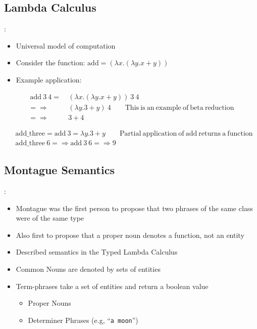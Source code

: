 \documentclass[logoontitle,tabu,supertabular,aspectratio=43]{preney-uwindsor-beamer}
\begin{document}
    \subsection{Lambda Calculus}
    \begin{frame}{\insertsection: \insertsubsection}
    \begin{itemize}
        \item Universal model of computation
        \item Consider the function: $\mathrm{add} = (\lambda x.(\lambda y.x + y))$
        \item Example application:
    \end{itemize}
    \begin{equation*}
        \begin{split}
            \ \mathrm{add}\ 3\ 4 =&\ (\lambda x.(\lambda y.x + y))\ 3\ 4 \\
            =\!\Rightarrow &\ (\lambda y.3 + y)\ 4 \qquad\mathrm{This\ is\ an\ example\ of\ beta\ reduction}\\
            =\!\Rightarrow &\ 3 + 4
        \end{split}
    \end{equation*}

    \begin{equation*}
        \begin{split}
            &\mathrm{add\_three} = \mathrm{add}\ 3 = \lambda y. 3 + y \qquad\mathrm{Partial\ application\ of\ add\ returns\ a\ function}\\
            &\mathrm{add\_three}\ 6 =\!\Rightarrow \mathrm{add}\ 3\ 6 =\!\Rightarrow 9
        \end{split}
    \end{equation*}
    \end{frame}

    \subsection{Montague Semantics}
    \begin{frame}{\insertsection: \insertsubsection}
        \begin{itemize}
            \item Montague was the first person to propose that two phrases of the same class were of the same type
            \item Also first to propose that a proper noun denotes a function, not an entity
            \item Described semantics in the Typed Lambda Calculus
            \item Common Nouns are denoted by sets of entities
            \item Term-phrases take a set of entities and return a boolean value
            \begin{itemize}
                \item Proper Nouns
                \item Determiner Phrases (e.g, ``\texttt{a moon}'')
            \end{itemize}
        \end{itemize}
    \end{frame}
\end{document}
